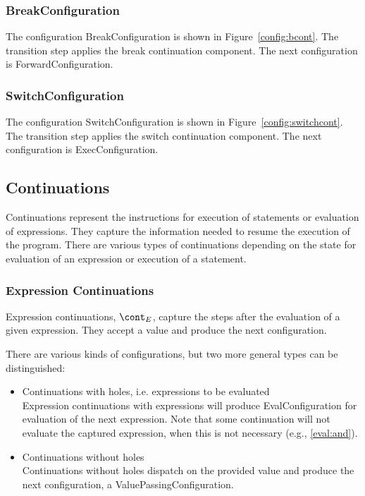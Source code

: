 \documentclass[a4paper,oneside,fleqn]{article}
\begin{document}
\subsubsection{BreakConfiguration}
\label{subsubsec:breakconfig}

The configuration BreakConfiguration is shown in Figure~\ref{config:bcont}.
The transition step applies the break continuation component.
The next configuration is ForwardConfiguration.


\subsubsection{SwitchConfiguration}
\label{subsubsec:switchconfig}

The configuration SwitchConfiguration is shown in Figure~\ref{config:switchcont}.
The transition step applies the switch continuation component.
The next configuration is ExecConfiguration.


\subsection{Continuations}
\label{subsec:continuations-definition}

Continuations represent the instructions for execution of statements or evaluation of expressions.
They capture the information needed to resume the execution of the program.
There are various types of continuations depending on the state for evaluation of an expression or execution of a statement.


\subsubsection{Expression Continuations}
\label{subsubsec:expression-continuations}

Expression continuations, $\econt$, capture the steps after the evaluation of a given expression.
They accept a value and produce the next configuration.

There are various kinds of configurations, but two more general types can be distinguished:

\begin{itemize}
    \item Continuations with holes, i.e. expressions to be evaluated\\
        Expression continuations with expressions will produce EvalConfiguration for evaluation of the next expression.
        Note that some continuation will not evaluate the captured expression, when this is not necessary (e.g., \eqref{eval:and}).

    \item Continuations without holes\\
        Continuations without holes dispatch on the provided value and produce the next configuration, a ValuePassingConfiguration.

\end{itemize}
\end{document}

